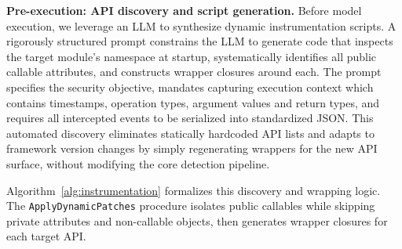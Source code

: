 \noindent \textbf{Pre-execution: API discovery and script generation.}
Before model execution, we leverage an LLM to synthesize dynamic instrumentation scripts. A rigorously structured prompt constrains the LLM to generate code that inspects the target module's namespace at startup, systematically identifies all public callable attributes, and constructs wrapper closures around each. The prompt specifies the security objective, mandates capturing execution context which contains timestamps, operation types, argument values and return types, and requires all intercepted events to be serialized into standardized JSON. This automated discovery eliminates statically hardcoded API lists and adapts to framework version changes by simply regenerating wrappers for the new API surface, without modifying the core detection pipeline.

Algorithm~\ref{alg:instrumentation} formalizes this discovery and wrapping logic. The \texttt{ApplyDynamicPatches} procedure isolates public callables while skipping private attributes and non-callable objects, then generates wrapper closures for each target API.

\begin{algorithm}[t!]
\caption{Automated Dynamic Instrumentation Logic}
\label{alg:instrumentation}


\end{algorithm}


